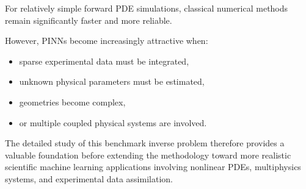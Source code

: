 For relatively simple forward PDE simulations, classical numerical methods remain significantly faster and more reliable.

However, PINNs become increasingly attractive when:
\begin{itemize}
    \item sparse experimental data must be integrated,
    \item unknown physical parameters must be estimated,
    \item geometries become complex,
    \item or multiple coupled physical systems are involved.
\end{itemize}

The detailed study of this benchmark inverse problem therefore provides a valuable foundation before extending the methodology toward more realistic scientific machine learning applications involving nonlinear PDEs, multiphysics systems, and experimental data assimilation.